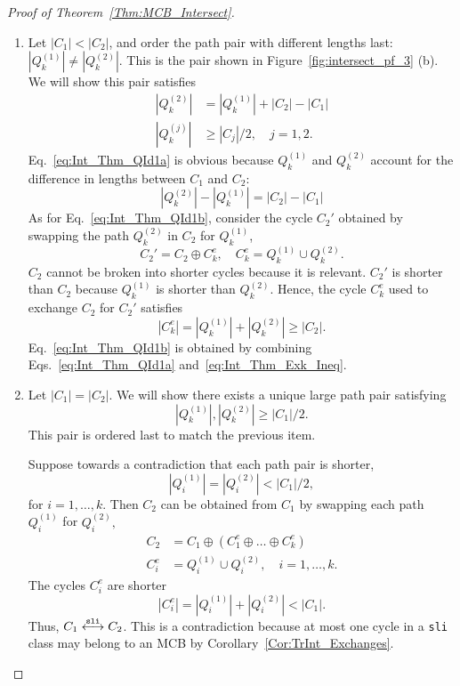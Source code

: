 \documentclass[fleqn,11pt]{article}
\newcommand\slInt{ \stackrel{\tt sli}{\longleftrightarrow} }
\begin{document}
\begin{proof}[Proof of Theorem~\ref{Thm:MCB_Intersect}]
	\begin{enumerate}
		\item Let $|C_1|<|C_2|$, and order the path pair with different lengths last: $|Q_k^{(1)}| \ne |Q_k^{(2)}|$. This is the pair shown in Figure~\ref{fig:intersect_pf_3} (b). We will show this pair satisfies
		\begin{align}
			|Q_k^{(2)}| &= |Q_k^{(1)}|+|C_2|-|C_1|\label{eq:Int_Thm_QId1a}\\
			|Q_k^{(j)}| &\ge |C_j|/2,\quad j=1,2.\label{eq:Int_Thm_QId1b}
		\end{align}
		Eq.~\eqref{eq:Int_Thm_QId1a} is obvious because $Q_k^{(1)}$ and $Q_k^{(2)}$ account for the difference in lengths between $C_1$ and $C_2$:
		\begin{equation*}
			|Q_k^{(2)}| - |Q_k^{(1)}| = |C_2|-|C_1|
		\end{equation*}
		As for Eq.~\eqref{eq:Int_Thm_QId1b}, consider the cycle $C_2'$ obtained by swapping the path $Q_k^{(2)}$ in $C_2$ for $Q_k^{(1)}$,
		\begin{equation*}
			C_2'= C_2\oplus C_k^e,\quad C_k^e = Q_k^{(1)}\cup Q_k^{(2)}.
		\end{equation*}
		$C_2$ cannot be broken into shorter cycles because it is relevant. $C_2'$ is shorter than $C_2$ because $Q_k^{(1)}$ is shorter than $Q_k^{(2)}$. Hence, the cycle $C_k^e$ used to exchange $C_2$ for $C_2'$ satisfies
		\begin{equation}
			|C_k^e| = |Q_k^{(1)}|+|Q_k^{(2)}| \ge |C_2|.
			\label{eq:Int_Thm_Exk_Ineq}
		\end{equation}
		Eq.~\eqref{eq:Int_Thm_QId1b} is obtained by combining Eqs.~\eqref{eq:Int_Thm_QId1a} and~\eqref{eq:Int_Thm_Exk_Ineq}.
		
		\item Let $|C_1|=|C_2|$. We will show there exists a unique large path pair satisfying
		\begin{equation}
			|Q_k^{(1)}|,|Q_k^{(2)}|\ge |C_1|/2.
		\end{equation}
		This pair is ordered last to match the previous item. 
		
		Suppose towards a contradiction that each path pair is shorter,
		\begin{equation*}
			|Q_i^{(1)}|=|Q_i^{(2)}| < |C_1|/2,
		\end{equation*}
		for $i=1,\hdots,k$. Then $C_2$ can be obtained from $C_1$ by swapping each path $Q_i^{(1)}$ for $Q_i^{(2)},$
		\begin{equation*}
			\begin{split}
			C_2 &= C_1\oplus(C_1^e\oplus\hdots\oplus C_k^e)\\
			C_i^e &= Q_i^{(1)}\cup Q_i^{(2)},\quad i=1,\hdots,k.
			\end{split}
		\end{equation*}
		The cycles $C_i^e$ are shorter
		\begin{equation*}
			|C_i^e| = |Q_i^{(1)}|+|Q_i^{(2)}|<|C_1|.
		\end{equation*}
		Thus, $C_1\slInt C_2$. This is a contradiction because at most one cycle in a {\tt sli} class may belong to an MCB by Corollary~\ref{Cor:TrInt_Exchanges}.
		

\end{enumerate}
\end{proof}
\end{document}
